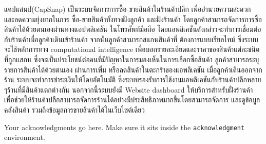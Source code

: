 \maketitle
\makesignature

\ifproject
\begin{abstractTH}
    \enskip แคปแสนป(CapSnap) เป็นระบบจัดการการซื้อ-ขายสินค้าในร้านค้าปลีก เพื่ออำนวยความสะดวก และลดความยุ่งยากในการ
    ซื้อ-ขายสินค้าทั้งทางฝั่งลูกค้า และฝั่งร้านค้า โดยลูกค้าสามารถจัดการการซื้อสินค้าได้ด้วยตนเองผ่านทางแอปพลิเคชัน
    ในโทรศัพท์มือถือ โดยแอพลิเคชันดังกล่าวจะทำการเชื่อมต่อกับร้านค้าเมื่อลูกค้าเดินเข้าร้านค้า จากนั้นลูกค้าสามารถสแกนสินค้าที่
    ต้องการแบบเรียลไทม์ ซึ่งระบบจะใช้หลักการทาง computational intelligence เพื่อบอกรายละเอียดและราคาของสินค้าแต่ละชนิดที่ถูกแสกน
    \enskip ซึ่งจะเป็นประโยชน์ต่อคนที่มีปัญหาในการมองเห็นในการเลือกซื้อสินค้า ลูกค้าสามารถระบุรายการสินค้าได้ด้วยตนเอง
    ผ่านการเพิ่ม หรือลดสินค้าในตะกร้าของแอพลิเคชัน เมื่อลูกค้าเดินออกจากร้าน ระบบจะทำการชำระเงินให้โดยอัตโนมัติ 
    ซึ่งระบบรองรับการใช้งานแอพลิเคชันกับร้านค้าปลีกหลาย ๆร้านที่มีสินค้าแตกต่างกัน นอกจากนี้ระบบยังมี 
    \enskip Website dashboard ให้บริการสําหรับฝั่งร้านค้า เพื่อช่วยให้ร้านค้าปลีกสามารถจัดการร้านได้อย่างมีประสิทธิภาพมากขึ้นโดยสามารถจัดการ 
    และดูข้อมูลคลังสินค้า รวมถึงข้อมูลการขายสินค้าได้ในเว็บไซต์เดียว
    
\end{abstractTH}



\iffalse
\begin{dedication}
This document is dedicated to all Chiang Mai University students.

Dedication page is optional.
\end{dedication}
\fi %

\begin{acknowledgments}
Your acknowledgments go here. Make sure it sits inside the
\texttt{acknowledgment} environment.

\end{acknowledgments}%
\fi %

\contentspage

\ifproject
\figurelistpage

\tablelistpage
\fi %



